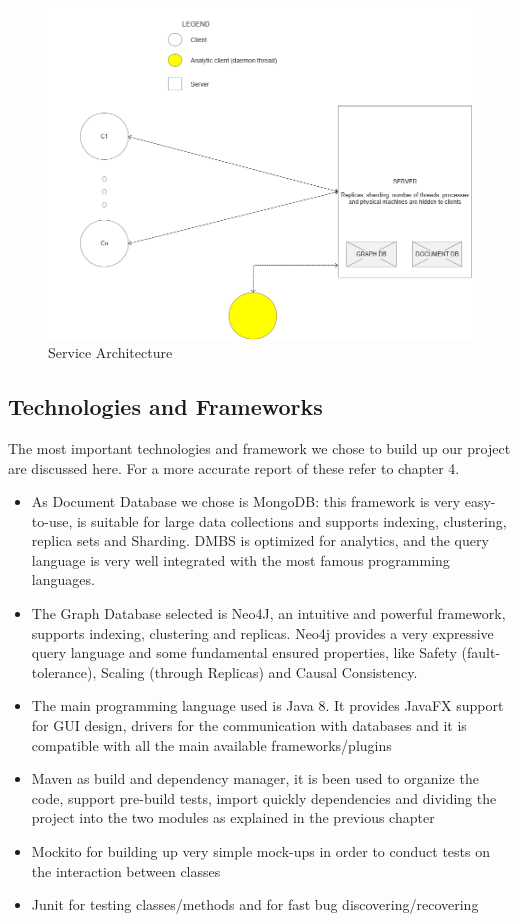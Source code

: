\begin{figure}[H]
	\centering
	\includegraphics[width=\textwidth]{img/architecture.png}
	\caption{Service Architecture}
\end{figure}


\subsection{Technologies and Frameworks}
The most important technologies and framework we chose to build up our project are discussed here. For a more accurate report of these refer to chapter 4.
\begin{itemize}
\item As Document Database we chose is MongoDB: this framework is very easy-to-use, is suitable for large data collections and supports indexing, clustering, replica sets and Sharding. DMBS is optimized for analytics, and the query language is very well integrated with the most famous programming languages.
\item The Graph Database selected is Neo4J, an intuitive and powerful framework, supports indexing, clustering and replicas. Neo4j provides a very expressive query language and some fundamental ensured properties, like Safety (fault-tolerance), Scaling (through Replicas) and Causal Consistency.
\item The main programming language used is Java 8. It provides JavaFX support for GUI design, drivers for the communication with databases and it is compatible with all the main available frameworks/plugins
\item Maven as build and dependency manager, it is been used to organize the code, support pre-build tests, import quickly dependencies and dividing the project into the two modules as explained in the previous chapter
\item Mockito for building up very simple mock-ups in order to conduct tests on the interaction between classes
\item Junit for testing classes/methods and for fast bug discovering/recovering    
\end{itemize}
